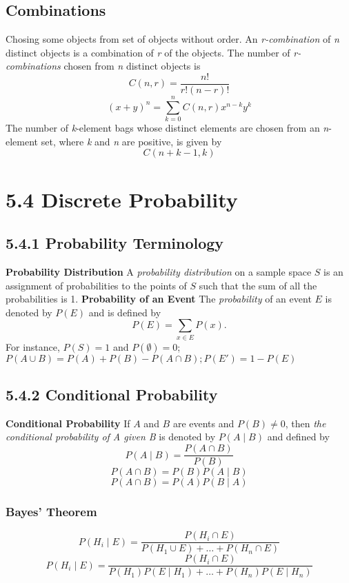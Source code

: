 \documentclass[10pt,twocolumn]{article}
\begin{document}
	\subsection*{Combinations}
	Chosing some objects from set of objects without order.
	An \textit{r-combination} of \textit{n} distinct objects is a
        combination of \textit{r} of the objects. The number of
        \textit{r-combinations} chosen from \textit{n} distinct objects is
	\[C(n,r)=\frac{n!}{r!(n-r)!}\]
	\[(x+y)^n=\sum_{k=0}^nC(n,r)x^{n-k}y^k\]
	The number of \textit{k}-element bags whose distinct elements
        are chosen from an \textit{n}-element set, where \textit{k}
        and \textit{n} are positive, is given by
	\[C(n+k-1, k)\]

	\section*{5.4 Discrete Probability}
	\subsection*{5.4.1 Probability Terminology}
	\textbf{Probability Distribution} A \emph{probability
          distribution} on a sample space $S$ is an assignment of
        probabilities to the points of $S$ such that the sum of all
        the probabilities is 1.
	\textbf{Probability of an Event} The \emph{probability} of an
        event $E$ is denoted by $P(E)$ and is defined by
	\[P(E)=\sum_{x\in E}P(x).\]
	For instance, $P(S)=1$ and $P(\emptyset)=0$; $P(A\cup B)=P(A)+P(B)-P(A\cap B); P(E')=1-P(E)$
	
	\subsection*{5.4.2 Conditional Probability}
	
	\textbf{Conditional Probability} If $A$ and $B$ are events and
        $P(B)\neq0$, then \emph{the conditional probability of A given
          B} is denoted by $P(A\mid B)$ and defined by
	\[P(A\mid B)=\frac{P(A\cap B)}{P(B)}\]
	\[P(A\cap B)=P(B)P(A\mid B)\]
	\[P(A\cap B)=P(A)P(B\mid A)\]

	\subsubsection*{Bayes' Theorem}
	\[P(H_i\mid E)=\frac{P(H_i\cap E)}{P(H_1\cup E)+\ldots+P(H_n\cap E)}\]
	\[P(H_i\mid E)=\frac{P(H_i\cap E)}{P(H_1)P(E\mid H_1)+\ldots+P(H_n)P(E\mid  H_n)}\]
	
\end{document}
